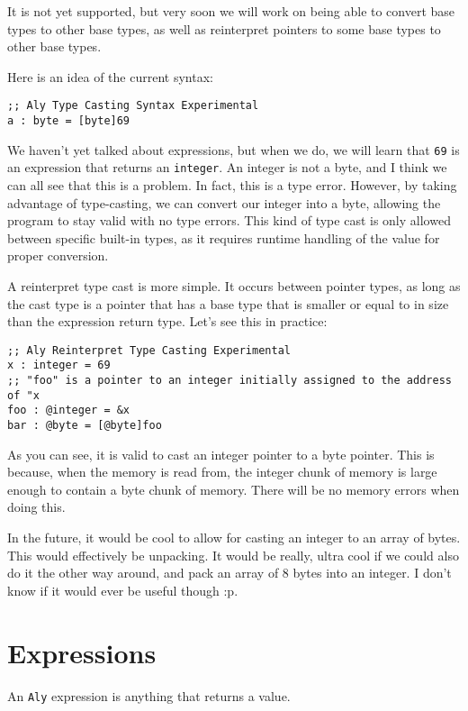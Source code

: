 \documentclass[12pt]{report}
\begin{document}
It is not yet supported, but very soon we will work on being able to convert base types to other base types, as well as reinterpret pointers to some base types to other base types.

Here is an idea of the current syntax:
\begin{Verbatim}[samepage=true]
;; Aly Type Casting Syntax Experimental
a : byte = [byte]69
\end{Verbatim}

We haven't yet talked about expressions, but when we do, we will learn that \verb|69| is an expression that returns an \verb|integer|. An integer is not a byte, and I think we can all see that this is a problem. In fact, this is a type error. However, by taking advantage of type-casting, we can convert our integer into a byte, allowing the program to stay valid with no type errors. This kind of type cast is only allowed between specific built-in types, as it requires runtime handling of the value for proper conversion.

A reinterpret type cast is more simple. It occurs between pointer types, as long as the cast type is a pointer that has a base type that is smaller or equal to in size than the expression return type. Let's see this in practice:
\begin{Verbatim}[samepage=true]
;; Aly Reinterpret Type Casting Experimental
x : integer = 69
;; "foo" is a pointer to an integer initially assigned to the address of "x
foo : @integer = &x
bar : @byte = [@byte]foo
\end{Verbatim}

As you can see, it is valid to cast an integer pointer to a byte pointer. This is because, when the memory is read from, the integer chunk of memory is large enough to contain a byte chunk of memory. There will be no memory errors when doing this.

In the future, it would be cool to allow for casting an integer to an array of bytes. This would effectively be unpacking. It would be really, ultra cool if we could also do it the other way around, and pack an array of 8 bytes into an integer. I don't know if it would ever be useful though :p.

\chapter{Expressions}
\label{sec:expressions}

An \verb|Aly| expression is anything that returns a value.
\end{document}
